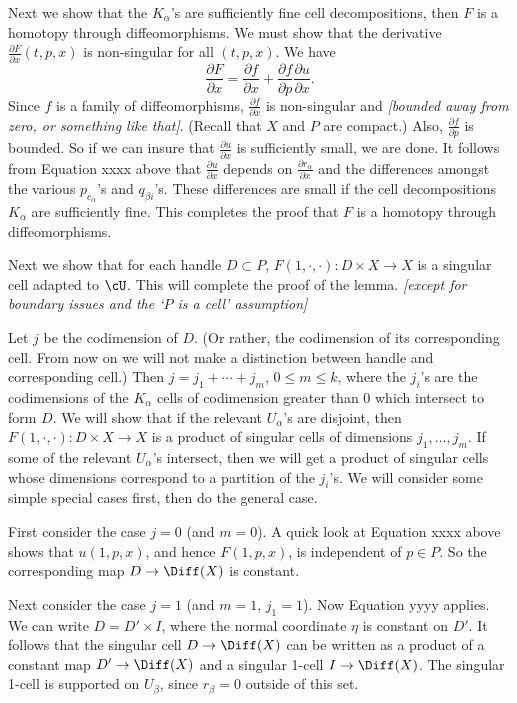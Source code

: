 \documentclass[11pt,leqno]{article}
\def\sub{\subset}
\def\pd#1#2{\frac{\partial #1}{\partial #2}}
\def\nn#1{{{\it \small [#1]}}}
\newcommand{\eq}[1]{\begin{displaymath}#1\end{displaymath}}
\begin{document}
Next we show that the $K_\alpha$'s are sufficiently fine cell decompositions,
then $F$ is a homotopy through diffeomorphisms.
We must show that the derivative $\pd{F}{x}(t, p, x)$ is non-singular for all $(t, p, x)$.
We have
\eq{
	\pd{F}{x} = \pd{f}{x} + \pd{f}{p} \pd{u}{x} .
}
Since $f$ is a family of diffeomorphisms, $\pd{f}{x}$ is non-singular and
\nn{bounded away from zero, or something like that}.
(Recall that $X$ and $P$ are compact.)
Also, $\pd{f}{p}$ is bounded.
So if we can insure that $\pd{u}{x}$ is sufficiently small, we are done.
It follows from Equation xxxx above that $\pd{u}{x}$ depends on $\pd{r_\alpha}{x}$
and the differences amongst the various $p_{c_\alpha}$'s and $q_{\beta i}$'s.
These differences are small if the cell decompositions $K_\alpha$ are sufficiently fine.
This completes the proof that $F$ is a homotopy through diffeomorphisms.

\medskip

Next we show that for each handle $D \sub P$, $F(1, \cdot, \cdot) : D\times X \to X$
is a singular cell adapted to $\cU$.
This will complete the proof of the lemma.
\nn{except for boundary issues and the `$P$ is a cell' assumption}

Let $j$ be the codimension of $D$. 
(Or rather, the codimension of its corresponding cell.  From now on we will not make a distinction
between handle and corresponding cell.)
Then $j = j_1 + \cdots + j_m$, $0 \le m \le k$,
where the $j_i$'s are the codimensions of the $K_\alpha$
cells of codimension greater than 0 which intersect to form $D$.
We will show that
if the relevant $U_\alpha$'s are disjoint, then
$F(1, \cdot, \cdot) : D\times X \to X$
is a product of singular cells of dimensions $j_1, \ldots, j_m$.
If some of the relevant $U_\alpha$'s intersect, then we will get a product of singular
cells whose dimensions correspond to a partition of the $j_i$'s.
We will consider some simple special cases first, then do the general case.

First consider the case $j=0$ (and $m=0$).
A quick look at Equation xxxx above shows that $u(1, p, x)$, and hence $F(1, p, x)$,
is independent of $p \in P$.
So the corresponding map $D \to \Diff(X)$ is constant.

Next consider the case $j = 1$ (and $m=1$, $j_1=1$).
Now Equation yyyy applies.
We can write $D = D'\times I$, where the normal coordinate $\eta$ is constant on $D'$.
It follows that the singular cell $D \to \Diff(X)$ can be written as a product
of a constant map $D' \to \Diff(X)$ and a singular 1-cell $I \to \Diff(X)$.
The singular 1-cell is supported on $U_\beta$, since $r_\beta = 0$ outside of this set.
\end{document}
